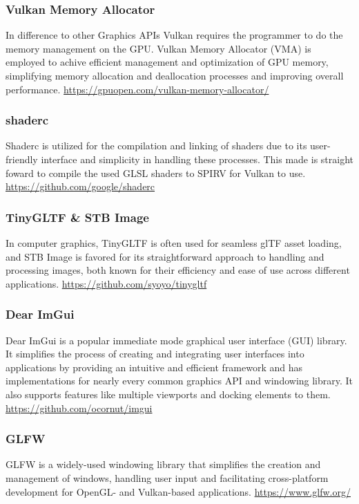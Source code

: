 \documentclass[intern]{cgMA}
\begin{document}
    \subsubsection*{Vulkan Memory Allocator}   
    In difference to other Graphics APIs Vulkan requires the programmer to do the memory management on the GPU. Vulkan Memory Allocator (VMA) is employed to achive efficient management and optimization of GPU memory, simplifying memory allocation and deallocation processes and improving overall performance. \url{https://gpuopen.com/vulkan-memory-allocator/}

    \subsubsection*{shaderc}   
    Shaderc is utilized for the compilation and linking of shaders due to its user-friendly interface and simplicity in handling these processes. This made is straight foward to compile the used GLSL shaders to SPIRV for Vulkan to use. \url{https://github.com/google/shaderc}

    \subsubsection*{TinyGLTF \& STB Image}  
    In computer graphics, TinyGLTF is often used for seamless glTF asset loading, and STB Image is favored for its straightforward approach to handling and processing images, both known for their efficiency and ease of use across different applications. \url{https://github.com/syoyo/tinygltf}

    \subsubsection*{Dear ImGui}
    Dear ImGui is a popular immediate mode graphical user interface (GUI) library. It simplifies the process of creating and integrating user interfaces into applications by providing an intuitive and efficient framework and has implementations for nearly every common graphics API and windowing library. It also supports features like multiple viewports and docking elements to them. \url{https://github.com/ocornut/imgui}

    \subsubsection*{GLFW}
    GLFW is a widely-used windowing library that simplifies the creation and management of windows, handling user input and facilitating cross-platform development for OpenGL- and Vulkan-based applications. \url{https://www.glfw.org/}
\end{document}
